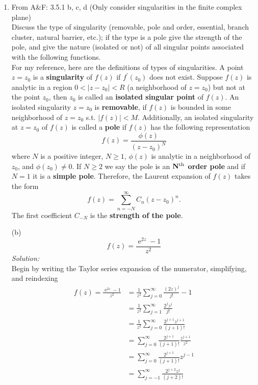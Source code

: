 \documentclass[10pt]{amsart}
\DeclareMathOperator{\E}{e}
\theoremstyle{nonumberplain}
\begin{document}
\mline
\begin{enumerate}[label={\bf {\arabic*}:}]
\item  From A\&F: 3.5.1 b, c, d (Only consider singularities in the finite
  complex plane) \\
Discuss the type of singularity (removable, pole and order, essential, branch cluster, natural barrier, etc.); if the type is a pole give the strength of the pole,  and give the nature (isolated or not) of all singular points associated with the following functions. \\

\noindent
For my reference, here are the definitions of types of singularities.
A point $z=z_0$ is a {\bf singularity} of $f(z)$ if $f^\prime(z_0)$ does not exist.
Suppose $f(z)$ is analytic in a region $0 < |z - z_0| < R$ (a neighborhood of $z = z_0$) but not at the point $z_0$, then $z_0$ is called an {\bf isolated singular point} of $f(z)$.
An isolated singularity $z=z_0$ is {\bf removable}, if $f(z)$ is bounded in some neighborhood of $z=z_0$ s.t. $|f(z)| < M$.
Additionally, an isolated singularity at $z = z_0$ of $f(z)$ is called a {\bf pole} if $f(z)$ has the following representation
$$
f(z) = \frac {\phi (z)}{(z - z_0)^N}
$$
where $N$ is a positive integer, $N \geq 1$, $\phi(z)$ is analytic in a neighborhood of $z_0$, and $\phi(z_0) \neq 0$.
If $N \geq 2$ we say the pole is an {\bf ${\bf N}^{\rm th}$ order pole} and if $N = 1$ it is a {\bf simple pole}.
Therefore, the Laurent expansion of $f(z)$ takes the form
$$
f(z) = \sum_{n=-N}^\infty C_n(z - z_0)^n.
$$
The first coefficient $C_{-N}$ is the {\bf strength of the pole}.

\noindent
(b)
$$
f(z) = \frac {\E^{2z} - 1} {z^2}
$$
\textit{Solution:} \\
Begin by writing the Taylor series expansion of the numerator, simplifying, and reindexing
\begin{align*}
f(z) = \frac {\E^{2z} - 1} {z^2} &= \frac 1 {z^2} \sum_{j=0}^\infty \frac{(2z)^j} {j!} - 1 \\
	&= \frac 1 {z^2} \sum_{j=1}^\infty \frac{2^jz^j} {j!} \\
	&= \frac 1 {z^2} \sum_{j=0}^\infty \frac{2^{j + 1}z^{j + 1}} {(j + 1)!} \\
	&= \sum_{j=0}^\infty \frac{2^{j + 1}} {(j + 1)!} \frac {z^{j + 1}}{z^2} \\
	&= \sum_{j=0}^\infty \frac{2^{j + 1}} {(j + 1)!} z^{j - 1} \\
	&= \sum_{j=-1}^\infty \frac{2^{j + 2}z^j} {(j + 2)!}
\end{align*}


\end{enumerate}
\end{document}
